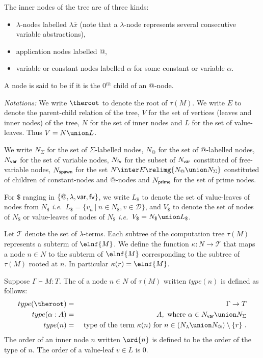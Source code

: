 The inner nodes of the tree are of three kinds:
\begin{itemize}
\item $\lambda$-nodes labelled $\lambda \overline{x}$ (note that a $\lambda$-node represents several consecutive variable abstractions),
\item application nodes labelled @,
\item variable or constant nodes labelled $\alpha$ for some constant or variable $\alpha$.
\end{itemize}
A node is said to be  if it is the 0$^{th}$ child of an @-node.
\bigskip

\emph{Notations:} We write $\theroot$ to denote the root of
$\tau(M)$. We write $E$ to denote the parent-child relation of the
tree, $V$ for the set of vertices (leaves and inner nodes) of the
tree, $N$ for the set of inner nodes and $L$ for the set of
value-leaves. Thus $V = N \union L$.

We write $N_\Sigma$ for the set of $\Sigma$-labelled nodes, $N_@$ for the set
of @-labelled nodes, $N_{\sf var}$ for the set of variable nodes,
$N_{\sf fv}$ for the subset of $N_{\sf var}$ constituted of free-variable
nodes, $N_{\sf spawn}$ for the set $N \inter E \relimg{N_@ \union N_\Sigma}$ constituted of children of constant-nodes and @-nodes and $N_{\sf prime}$ for the set of prime nodes.

For $\$$ ranging in $\{@, \lambda, {\sf var}, {\sf fv} \}$,
we write $L_\$$ to denote the set of value-leaves of nodes from $N_\$$
{\it i.e.}\ $L_\$ = \{ v_n \ | \ n \in N_\$, v \in \mathcal{D} \}$,
and $V_\$$ to denote the set of nodes of $N_\$$ or value-leaves of nodes of $N_\$$
{\it i.e.}\ $V_\$ = N_\$ \union L_\$ $.


Let $\mathcal{T}$ denote the set of $\lambda$-terms.
Each subtree of the computation tree $\tau(M)$ represents a subterm of $\elnf{M}$.
We define the function $\kappa : N \rightarrow \mathcal{T}$ that maps a node $n \in N$ to the subterm of $\elnf{M}$
corresponding to the subtree of $\tau(M)$ rooted at $n$.
In particular $\kappa(r) = \elnf{M}$.

\begin{definition}
\label{def:nodeorder}
Suppose $\Gamma \vdash M : T$.
The  of a node $n \in N$ of $\tau(M)$ written $type(n)$ is defined as follows:
\begin{eqnarray*}
type(\theroot) &=& \Gamma \rightarrow T \\
type(\alpha:A) &=& A, \mbox{ where $\alpha \in N_{\sf var} \union N_\Sigma$} \\
type(n) &=& \hbox{ type of the term $\kappa(n)$ for $n \in (N_\lambda \union N_@) \setminus \{r \}$\ .}
\end{eqnarray*}
The order of an inner node $n$ written $\ord{n}$ is defined to be
the order of the type of $n$. The order of a value-leaf $v \in L$ is
$0$.
\end{definition}


